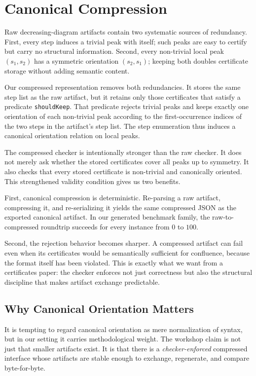 \documentclass[submission,copyright,creativecommons]{eptcs}
\begin{document}
\section{Canonical Compression}

Raw decreasing-diagram artifacts contain two systematic sources of redundancy.
First, every step induces a trivial peak with itself; such peaks are easy to
certify but carry no structural information. Second, every non-trivial local
peak $(s_1,s_2)$ has a symmetric orientation $(s_2,s_1)$; keeping both doubles
certificate storage without adding semantic content.

Our compressed representation removes both redundancies. It stores the same
step list as the raw artifact, but it retains only those certificates that
satisfy a predicate \texttt{shouldKeep}. That predicate rejects trivial peaks
and keeps exactly one orientation of each non-trivial peak according to the
first-occurrence indices of the two steps in the artifact's step list. The step
enumeration thus induces a canonical orientation relation on local peaks.

The compressed checker is intentionally stronger than the raw checker. It does
not merely ask whether the stored certificates cover all peaks up to symmetry.
It also checks that every stored certificate is non-trivial and canonically
oriented. This strengthened validity condition gives us two benefits.

First, canonical compression is deterministic. Re-parsing a raw artifact,
compressing it, and re-serializing it yields the same compressed JSON as the
exported canonical artifact. In our generated benchmark family, the
raw-to-compressed roundtrip succeeds for every instance from $0$ to $100$.

Second, the rejection behavior becomes sharper. A compressed artifact can fail
even when its certificates would be semantically sufficient for confluence,
because the format itself has been violated. This is exactly what we want from
a certificates paper: the checker enforces not just correctness but also the
structural discipline that makes artifact exchange predictable.

\subsection{Why Canonical Orientation Matters}

It is tempting to regard canonical orientation as mere normalization of syntax,
but in our setting it carries methodological weight. The workshop claim is not
just that smaller artifacts exist. It is that there is a \emph{checker-enforced}
compressed interface whose artifacts are stable enough to exchange, regenerate,
and compare byte-for-byte.
\end{document}

